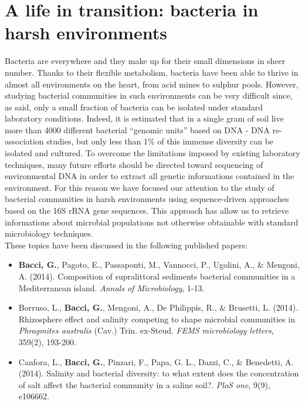 \logvartrue
\chapter{A life in transition: bacteria in harsh environments}
Bacteria are everywhere and they make up for their small dimensions in sheer number. Thanks to their flexible metabolism, bacteria have been able to thrive in almost all environments on the heart, from acid mines to sulphur pools. However, studying bacterial communities in such environments can be very difficult since, as said, only a small fraction of bacteria can be isolated under standard laboratory conditions. Indeed, it is estimated that in a single gram of soil live more than 4000 different bacterial ``genomic units'' based on DNA - DNA re-association studies, but only less than 1\% of this immense diversity can be isolated and cultured. To overcome the limitations imposed by existing laboratory techniques, many future efforts should be directed  toward sequencing of environmental DNA in order to extract all genetic informations contained in the environment. For this reason we have focused our attention to the study of bacterial communities in harsh environments using sequence-driven approaches based on the 16S rRNA gene sequences. This approach has allow us to retrieve informations about microbial populations not otherwise obtainable with standard microbiology techniques.\\
These topics have been discussed in the following published papers:\\
\vspace{-5mm}
\begin{itemize}[nosep]
\item \textbf{Bacci, G.}, Pagoto, E., Passaponti, M., Vannocci, P., Ugolini, A., \& Mengoni, A. (2014). Composition of supralittoral sediments bacterial communities in a Mediterranean island. \textit{Annals of Microbiology}, 1-13.\\
\item Borruso, L., \textbf{Bacci, G.}, Mengoni, A., De Philippis, R., \& Brusetti, L. (2014). Rhizosphere effect and salinity competing to shape microbial communities in \textit{Phragmites australis} (Cav.) Trin. ex-Steud. \textit{FEMS microbiology letters}, 359(2), 193-200.\\
\item Canfora, L., \textbf{Bacci, G.}, Pinzari, F., Papa, G. L., Dazzi, C., \& Benedetti, A. (2014). Salinity and bacterial diversity: to what extent does the concentration of salt affect the bacterial community in a saline soil?. \textit{PloS one}, 9(9), e106662.\\
\end{itemize}


